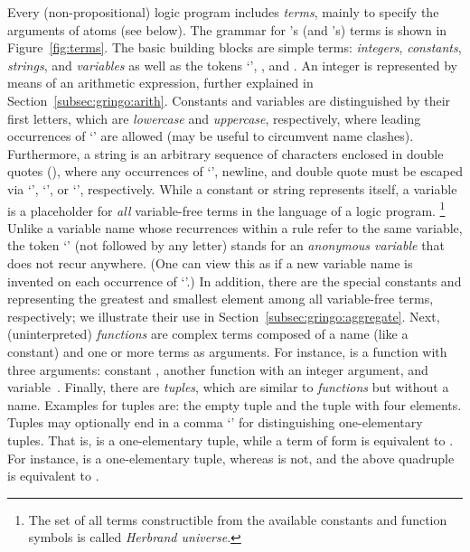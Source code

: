 Every (non-propositional) logic program includes \emph{terms},
mainly to specify the arguments of atoms (see below).
The grammar for \gringo's (and \clingo's) terms is shown in Figure~\ref{fig:terms}.
The basic building blocks are simple terms:
\emph{integers}, \emph{constants}, \emph{strings}, and \emph{variables}
as well as the tokens `', , and .
An integer is represented by means of an arithmetic expression,
further explained in Section~\ref{subsec:gringo:arith}.
Constants and variables are distinguished by their first letters,
which are \emph{lowercase} and \emph{uppercase}, respectively,
where leading occurrences of `' are allowed
(may be useful to circumvent name clashes).
Furthermore, a string is an arbitrary sequence of characters
enclosed in double quotes (),
where any occurrences of `\code{\textbackslash}', newline, and double quote
must be escaped via `\code{\textbackslash\textbackslash}', `',
or `', respectively.
While a constant or string represents itself,
a variable is a placeholder for \emph{all} variable-free terms
in the language of a logic program.%
\footnote{The set of all terms constructible from the available
          constants and function symbols is called \emph{Herbrand universe}.}
Unlike a variable name whose recurrences within a rule refer to the same variable,
the token `' (not followed by any letter)
stands for an \emph{anonymous variable} that does not recur anywhere.
(One can view this as if a new variable name is invented on each
 occurrence of `'.)
In addition, there are the special constants  and 
representing the greatest and smallest element among all variable-free terms, respectively;
we illustrate their use in Section~\ref{subsec:gringo:aggregate}.
Next, (uninterpreted) \emph{functions} are complex terms composed of a name (like a constant)
and one or more terms as arguments.
For instance,
is a function with three arguments:
constant , another function 
with an integer argument, and variable~.
Finally, there are \emph{tuples}, which are similar to \emph{functions} but without a name.
Examples for tuples are:
the empty tuple \code{()} and
the tuple  with four elements.
Tuples may optionally end in a comma `\code{,}'
for distinguishing one-elementary tuples.
That is,  is a one-elementary tuple,
while a term of form  is equivalent to .
For instance,  is a one-elementary tuple, whereas  is not,
and
the above quadruple is equivalent to .

